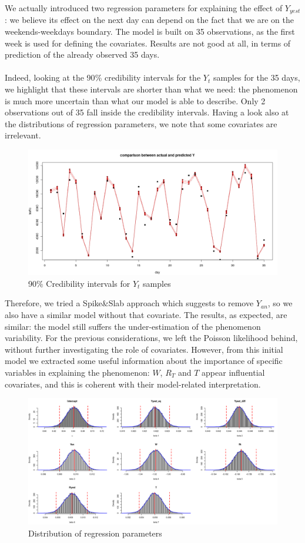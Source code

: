 \documentclass[11pt,twoside]{report}
\begin{document}
We actually introduced two regression parameters for explaining the effect of $Y_{yest}$: we believe its effect on the next day can depend on the fact that we are on the weekends-weekdays boundary.   
The model is built on 35 observations, as the first week is used for defining the covariates. Results are not good at all, in terms of prediction of the already observed 35 days.\\
\\
Indeed, looking at the 90$\%$ credibility intervals for the $Y_t$ samples for the 35 days, we highlight that these intervals are shorter than what we need: the phenomenon is much more uncertain than what our model is able to describe.
Only 2 observations out of 35 fall inside the credibility intervals.
Having a look also at the distributions of regression parameters, we note that some covariates are irrelevant.
\begin{figure}[H]
	\centering
	\includegraphics[width=160 mm]{pictures/poiss_y.png}
	\caption{90$\%$ Credibility intervals for $Y_t$ samples}
	\label{fig:poiss}
\end{figure}
Therefore, we tried a Spike\&Slab approach which suggests to remove $Y_{an}$, so we also have a similar model without that covariate. The results, as expected, are similar: the model still suffers the under-estimation of the phenomenon variability. For the previous considerations, we left the Poisson likelihood behind, without further investigating the role of covariates. However, from this initial model we extracted some useful information about the importance of specific variables in explaining the phenomenon: $W$, $R_T$ and $T$ appear influential covariates, and this is coherent with their model-related interpretation.

\begin{figure}[H]
	\centering
	\includegraphics[width=160 mm]{pictures/poiss_beta.png}
	\caption{Distribution of regression parameters}
	\label{fig:poiss_beta}
\end{figure}
\end{document}
